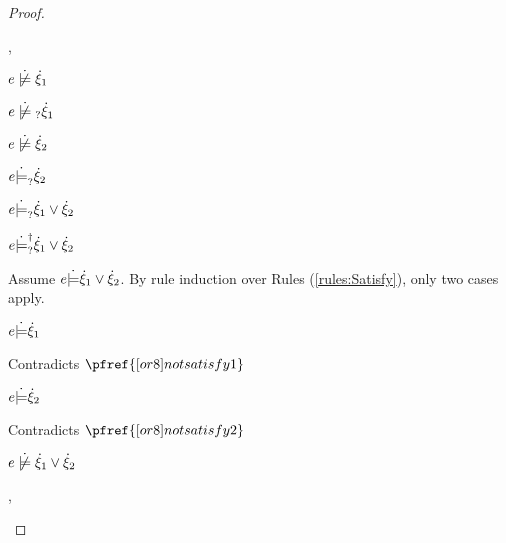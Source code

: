 \begin{proof}
\begin{byCases}
\begin{byCases}
    \item[\cnotsatisfyormay{e}{\hxi_1},\cmaysatisfy{e}{\hxi_2}]
        \begin{pfsteps*}
        \item $\cnotsatisfy{e}{\hxi_1}$  
        \item $\cnotmaysatisfy{e}{\hxi_1}$  
        \item $\cnotsatisfy{e}{\hxi_2}$  
        \item $e \dot{\models}_{?} \dot{\xi}_2$  
        \item $e \dot{\models}_{?} \dot{\xi}_1 \vee \dot{\xi}_2$  
        \item $e \dot{\models}_{?}^{\dag} \dot{\xi}_1 \vee \dot{\xi}_2$ 
        \end{pfsteps*}
        Assume $e \dot{\models} \dot{\xi}_1 \vee \dot{\xi}_2$. By rule induction over Rules (\ref{rules:Satisfy}), only two cases apply.
        \begin{byCases}
        \item[\text{(\ref{rule:CSOr1})}]
            \begin{pfsteps*}
            \item $e \dot{\models} \dot{\xi}_1$ 
            \end{pfsteps*}
            Contradicts $\pfref{[or8]notsatisfy1}$
        \item[\text{(\ref{rule:CSOr2})}]
            \begin{pfsteps*}
            \item $e \dot{\models} \dot{\xi}_2$ 
            \end{pfsteps*}
            Contradicts $\pfref{[or8]notsatisfy2}$
        \end{byCases}
        \begin{pfsteps*}
        \item $\cnotsatisfy{e}{\cor{\hxi_1}{\hxi_2}}$ 
        \end{pfsteps*}
    \item[\cnotsatisfyormay{e}{\hxi_1},\cnotsatisfyormay{e}{\hxi_2}]
        \begin{pfsteps*}

\end{pfsteps*}
\end{byCases}
\end{byCases}
\end{proof}

